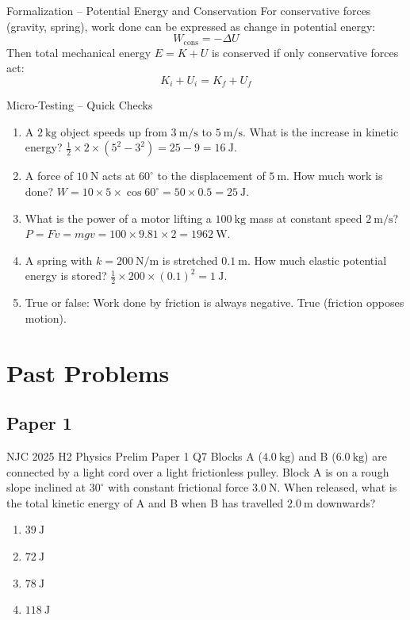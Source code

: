 \documentclass[11pt]{beamer}
\begin{document}
\begin{frame}{Formalization – Potential Energy and Conservation}
For conservative forces (gravity, spring), work done can be expressed as change in potential energy:
\[ W_{\text{cons}} = -\Delta U \]
Then total mechanical energy $E = K + U$ is conserved if only conservative forces act:
\[ K_i + U_i = K_f + U_f \]
\end{frame}

\begin{frame}{Micro-Testing – Quick Checks}
\begin{enumerate}
    \item A $2\ \mathrm{kg}$ object speeds up from $3\ \mathrm{m/s}$ to $5\ \mathrm{m/s}$. What is the increase in kinetic energy? \pause \alert{$\frac12 \times 2 \times (5^2 - 3^2) = 25 - 9 = 16\ \mathrm{J}$}.
    \item A force of $10\ \mathrm{N}$ acts at $60^\circ$ to the displacement of $5\ \mathrm{m}$. How much work is done? \pause \alert{$W = 10\times5\times\cos60^\circ = 50\times0.5 = 25\ \mathrm{J}$}.
    \item What is the power of a motor lifting a $100\ \mathrm{kg}$ mass at constant speed $2\ \mathrm{m/s}$? \pause \alert{$P = Fv = mgv = 100\times9.81\times2 = 1962\ \mathrm{W}$}.
    \item A spring with $k = 200\ \mathrm{N/m}$ is stretched $0.1\ \mathrm{m}$. How much elastic potential energy is stored? \pause \alert{$\frac12 \times 200 \times (0.1)^2 = 1\ \mathrm{J}$}.
    \item True or false: Work done by friction is always negative. \pause \alert{True (friction opposes motion)}.
\end{enumerate}
\end{frame}

\section{Past Problems}

\subsection{Paper 1}

\begin{frame}[shrink=15]{NJC 2025 H2 Physics Prelim Paper 1 Q7}
Blocks A ($4.0\ \mathrm{kg}$) and B ($6.0\ \mathrm{kg}$) are connected by a light cord over a light frictionless pulley. Block A is on a rough slope inclined at $30^\circ$ with constant frictional force $3.0\ \mathrm{N}$. When released, what is the total kinetic energy of A and B when B has travelled $2.0\ \mathrm{m}$ downwards?
\begin{enumerate}[A]
    \item $39\ \mathrm{J}$
    \item $72\ \mathrm{J}$
    \item $78\ \mathrm{J}$
    \item $118\ \mathrm{J}$
\end{enumerate}
\end{frame}
\end{document}
